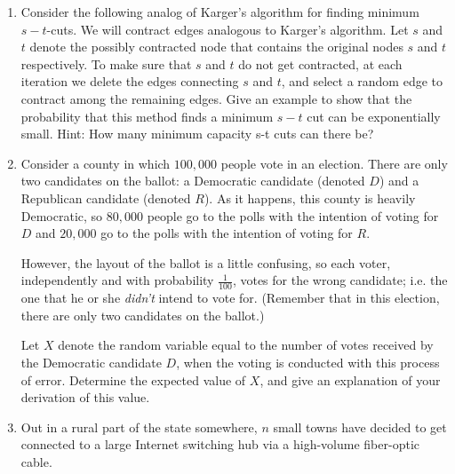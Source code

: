 \documentclass[12pt]{article}
\begin{document}
\begin{enumerate}

\item

Consider the following analog of Karger's algorithm for finding
minimum $s-t$-cuts. We will contract edges analogous to Karger's
algorithm. Let $s$ and $t$ denote the possibly contracted
node that contains the original nodes $s$ and $t$
respectively. To make sure that $s$ and $t$ do
not get contracted, at each iteration we delete the
edges connecting $s$ and $t$, and select a random
edge to contract among the remaining edges. Give an
example to show that the probability that this method
finds a minimum $s-t$ cut can be exponentially small.
Hint: How many minimum capacity s-t cuts can there
be?


\item

Consider a county in which $100,000$ people
vote in an election.
There are only two candidates on the ballot:
a Democratic candidate (denoted $D$) and
a Republican candidate (denoted $R$).
As it happens, this county is heavily Democratic,
so $80,000$ people go to the polls with the intention
of voting for $D$ and $20,000$
go to the polls with the intention of voting for $R$.

However, the layout of the ballot is a little confusing,
so each voter, independently and with probability $\frac{1}{100}$,
votes for the wrong candidate; i.e. the one that he or she
{\em didn't} intend to vote for.
(Remember that in this election, there are only
two candidates on the ballot.)

Let $X$ denote the random variable equal to the
number of votes received by the Democratic candidate $D$,
when the voting is conducted with this process of error.
Determine the expected value of $X$, and give
an explanation of your derivation of this value.



\item


Out in a rural part of the state somewhere,
$n$ small towns have decided to get connected
to a large Internet switching hub via
a high-volume fiber-optic cable.

\begin{figure}[h]
\begin{center}


\end{center}
\end{figure}
\end{enumerate}
\end{document}
